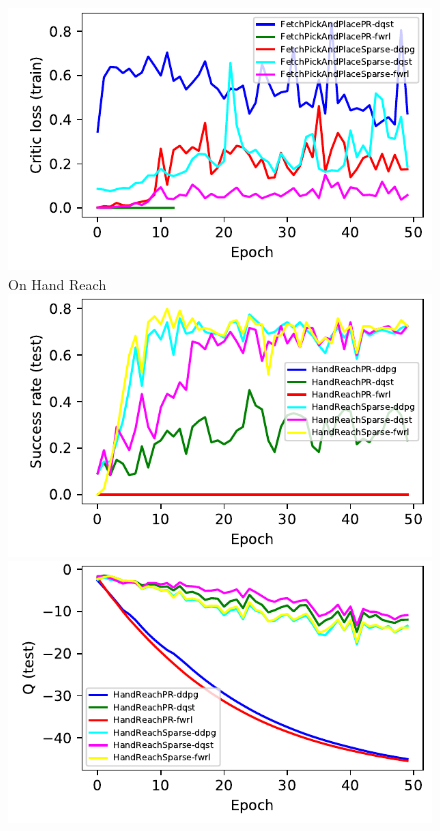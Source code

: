 \begin{figure}
  \includegraphics[width=\frac\columnwidth]{./media/res/d5cefef-path_reward-FetchPickAndPlacePR-v1-dqst/train/critic_loss.pdf}\\
  On Hand Reach \\
  \includegraphics[width=\frac\columnwidth]{./media/res/d5cefef-path_reward-HandReachPR-v0-dqst/test/success_rate.pdf}%
  \includegraphics[width=\frac\columnwidth]{./media/res/d5cefef-path_reward-HandReachPR-v0-dqst/test/mean_Q.pdf}%

\end{figure}
